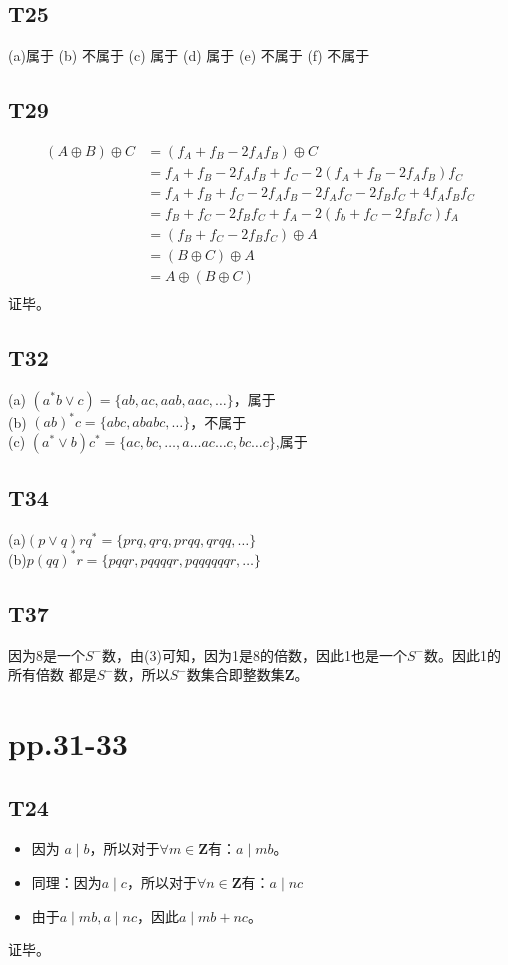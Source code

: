 \documentclass{article}
\begin{document}
\subsection{T25}
(a)属于 \quad (b) 不属于 \quad (c) 属于 \quad (d) 属于 \quad (e) 不属于 \quad (f) 不属于

\subsection{T29}
\begin{align*}
    (A \oplus B) \oplus C &= (f_A + f_B - 2f_Af_B) \oplus C\\
    &= f_A + f_B - 2f_Af_B + f_C - 2(f_A + f_B - 2f_Af_B)f_C\\
    &= f_A + f_B + f_C - 2f_Af_B - 2f_Af_C - 2f_Bf_C + 4f_Af_Bf_C\\
    &= f_B + f_C - 2f_Bf_C + f_A - 2(f_b + f_C - 2f_Bf_C)f_A\\
    &= (f_B + f_C - 2f_Bf_C) \oplus A\\
    &= (B \oplus C) \oplus A\\
    &= A \oplus (B \oplus C)\\
\end{align*}证毕。

\subsection{T32}\noindent
(a) $(a^* b \lor c) = \{ab, ac, aab, aac, \dots\}$，属于\\
(b) $(ab)^*c = \{abc, ababc, \dots\}$，不属于\\
(c) $(a^* \lor b)c^* = \{ac, bc, \dots,  a \dots ac \dots c, bc \dots c\}$,属于

\subsection{T34}
(a)$(p \lor q)rq^* = \{prq, qrq, prqq, qrqq, \dots \}$\\
(b)$p(qq)^*r = \{pqqr, pqqqqr, pqqqqqqr, \dots\}$
\subsection{T37}
因为8是一个$S^-$数，由(3)可知，因为1是8的倍数，因此1也是一个$S^-$数。因此1的所有倍数
都是$S^-$数，所以$S^-$数集合即整数集$\mathbf{Z}$。
\section{pp.31-33}
\subsection{T24}
\begin{itemize}
    \item 因为 $a \mid b$，所以对于$\forall m \in \mathbf{Z}$有：$a \mid mb$。
    \item 同理：因为$a \mid c$，所以对于$\forall n \in \mathbf{Z}$有：$a \mid nc$
    \item 由于$a \mid mb, a \mid nc$，因此$a \mid mb + nc$。
\end{itemize}
证毕。
\end{document}
